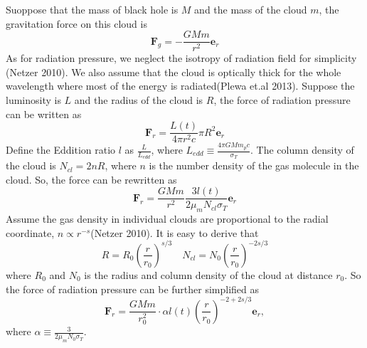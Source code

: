 \documentclass{article}
\begin{document}
Suoppose that the mass of black hole is $M$ and the mass of the cloud $m$, the gravitation force on this cloud is
\[\mathbf{F}_{g} = -\frac{GMm}{r^2}\mathbf{e}_r \]
As for radiation pressure, we neglect the isotropy of radiation field for simplicity (Netzer 2010). We also assume that the cloud is optically thick for the whole wavelength where most of the energy is radiated(Plewa et.al 2013). Suppose the luminosity is $L$ and the radius of the cloud is $R$, the force of radiation pressure can be written as
\[\mathbf{F}_{r} = \frac{L(t)}{4\pi r^2 c} \pi R^2 \mathbf{e}_r\]
Define the Eddition ratio $l$ as $\frac{L}{L_{edd}}$, where $L_{edd} \equiv \frac{4\pi GMm_pc}{\sigma_T}$. The column density of the cloud is $N_{cl} = 2nR$, where $n$ is the number density of the gas molecule in the cloud. So, the force can be rewritten as
\[\mathbf{F}_{r} = \frac{GMm}{r^2} \frac{3l(t)}{2\mu_{m}N_{cl}\sigma_T} \mathbf{e}_r\]
Assume the gas density in individual clouds are proportional to the radial coordinate, $n \propto r^{-s}$(Netzer 2010). It is easy to derive that
$$ R = R_0 \left( \frac{r}{r_0}\right)^{s/3} \quad N_{cl} = N_0 \left( \frac{r}{r_0}\right)^{-2s/3} $$
where $R_0$ and $N_0$ is the radius and column density of the cloud at distance $r_0$. So the force of radiation pressure can be further simplified as
$$\mathbf{F}_{r} = \frac{GMm}{r_0^2} \cdot \alpha l(t)  \left( \frac{r}{r_0}\right)^{-2+2s/3} \mathbf{e}_r,$$
where $\alpha \equiv \frac{3}{2\mu_{m}N_0\sigma_T}$.
\end{document}
